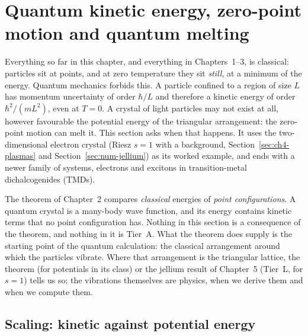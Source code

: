 \section[Quantum zero-point motion and quantum melting]{Quantum kinetic energy, zero-point motion and quantum melting}\label{qm:sec}

Everything so far in this chapter, and everything in Chapters~1--3, is classical: particles sit at points, and at
zero temperature they sit \emph{still}, at a minimum of the energy. Quantum mechanics forbids this. A particle confined
to a region of size $L$ has momentum uncertainty of order $\hbar/L$ and therefore a kinetic energy of order
$\hbar^2/(mL^2)$, even at $T=0$. A crystal of light particles may not exist at all, however favourable the potential
energy of the triangular arrangement: the zero-point motion can melt it. This section asks when that happens. It
uses the two-dimensional electron crystal (Riesz $s=1$ with a background, Section~\ref{sec:ch4-plasmas} and
Section~\ref{sec:num-jellium}) as its worked example, and ends with a newer family of systems, electrons and excitons
in transition-metal dichalcogenides (TMDs).

\begin{warnbox}
The theorem of Chapter~2 compares \emph{classical} energies of \emph{point configurations}. A quantum crystal is a
many-body wave function, and its energy contains kinetic terms that no point configuration has. Nothing in this
section is a consequence of the theorem, and nothing in it is Tier~A. What the theorem does supply is the starting
point of the quantum calculation: the classical arrangement around which the particles vibrate. Where that
arrangement is the triangular lattice, the theorem (for potentials in its class) or the jellium result of
Chapter~5 (Tier~L, for $s=1$) tells us so; the vibrations themselves are physics, \tierC{} when we derive them and
\tierX{} when we compute them.
\end{warnbox}

\subsection{Scaling: kinetic against potential energy}\label{qm:sec-scaling}

